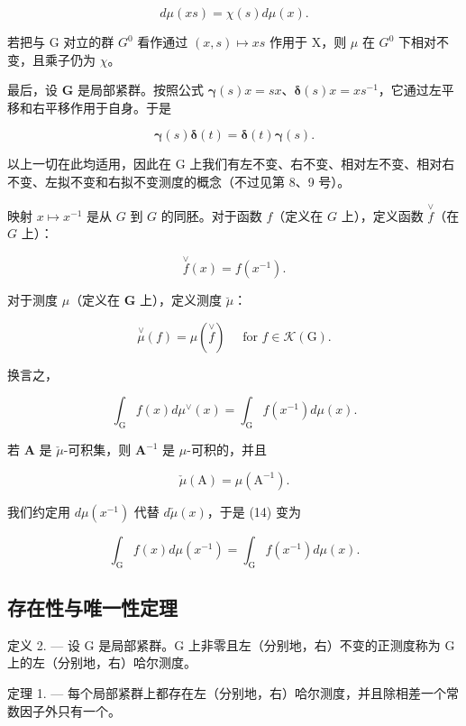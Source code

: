 \[
d \mu (x s) = \chi (s) d \mu (x).\tag{10'}
\]

若把与 G 对立的群 \(G^{0}\) 看作通过 \((x, s) \mapsto xs\) 作用于 X，则 \(\mu\) 在 \(G^{0}\) 下相对不变，且乘子仍为 \(\chi\)。

最后，设 \(\mathbf{G}\) 是局部紧群。按照公式 \(\pmb{\gamma}(s)x = sx\)、\(\pmb{\delta}(s)x = xs^{-1}\)，它通过左平移和右平移作用于自身。于是

\[
\boldsymbol {\gamma} (s) \boldsymbol {\delta} (t) = \boldsymbol {\delta} (t) \boldsymbol {\gamma} (s).\tag{11}
\]

以上一切在此均适用，因此在 G 上我们有左不变、右不变、相对左不变、相对右不变、左拟不变和右拟不变测度的概念（不过见第 8、9 号）。

映射 \(x \mapsto x^{-1}\) 是从 \(G\) 到 \(G\) 的同胚。对于函数 \(f\)（定义在 \(G\) 上），定义函数 \(\overset{\vee}{f}\)（在 \(G\) 上）：

\[
\stackrel {\vee} {f} (x) = f (x ^ {- 1}).\tag{12}
\]

对于测度 \(\mu\)（定义在 \(\mathbf{G}\) 上），定义测度 \(\breve{\mu}\)：

\[
\stackrel {\vee} {\mu} (f) = \mu (\stackrel {\vee} {f}) \quad \text { for } f \in \mathcal {K} (\mathrm{G}).\tag{13}
\]

换言之，

\[
\int_ {\mathrm{G}} f (x) d \mu^ {\vee} (x) = \int_ {\mathrm{G}} f (x ^ {- 1}) d \mu (x).\tag{14}
\]

若 \(\mathbf{A}\) 是 \(\check{\mu}\)-可积集，则 \(\mathbf{A}^{-1}\) 是 \(\mu\)-可积的，并且

\[
\check {\mu} (\mathrm{A}) = \mu (\mathrm{A} ^ {- 1}).\tag{15}
\]

我们约定用 \(d\mu(x^{-1})\) 代替 \(d\check{\mu}(x)\)，于是 (14) 变为

\[
\int_ {\mathrm{G}} f (x) d \mu (x ^ {- 1}) = \int_ {\mathrm{G}} f (x ^ {- 1}) d \mu (x).
\]

\subsection{存在性与唯一性定理}

定义 2. --- 设 G 是局部紧群。G 上非零且左（分别地，右）不变的正测度称为 G 上的左（分别地，右）哈尔测度。

定理 1. --- 每个局部紧群上都存在左（分别地，右）哈尔测度，并且除相差一个常数因子外只有一个。

